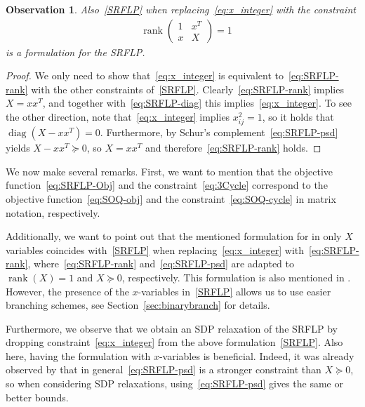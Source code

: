 \documentclass{article}
\newcommand{\SRFLP}{SRFLP\xspace}
\DeclareMathOperator{\rank}{rank}
\DeclareMathOperator{\diag}{diag}
\newtheorem{observation}[theorem]{Observation}
\begin{document}
\begin{observation}\label{obs:rank-x_integer}
    Also~\eqref{SRFLP} when replacing~\eqref{eq:x_integer} with the constraint
    \begin{align}
    & \rank\begin{pmatrix}
    1 & x^T \\
    x & X
\end{pmatrix} = 1 \label{eq:SRFLP-rank}
    \end{align}
    is a formulation for the \SRFLP.
\end{observation}
\begin{proof} 
    We only need to show that~\eqref{eq:x_integer} is equivalent to~\eqref{eq:SRFLP-rank} with the other constraints of~\eqref{SRFLP}.
    Clearly~\eqref{eq:SRFLP-rank} implies $X = xx^T$, and together with~\eqref{eq:SRFLP-diag} this implies~\eqref{eq:x_integer}. To see the other direction, note that~\eqref{eq:x_integer} implies $x_{ij}^2 = 1$, so it holds that $\diag(X - xx^T)=0$. Furthermore, by Schur's complement~\eqref{eq:SRFLP-psd} yields $X-xx^T \succeq 0$, so $X = xx^T$ and therefore~\eqref{eq:SRFLP-rank} holds.
\end{proof}

We now make several remarks.
First, we want to mention that the objective function~\eqref{eq:SRFLP-Obj} and the constraint~\eqref{eq:3Cycle} correspond to the objective function~\eqref{eq:SOQ-obj} and the constraint~\eqref{eq:SOQ-cycle} in matrix notation, respectively.

Additionally, we want to point out that the mentioned formulation for \citet{anjos_semidefinite_2005} in only $X$ variables coincides with~\eqref{SRFLP} when replacing~\eqref{eq:x_integer} with~\eqref{eq:SRFLP-rank}, where~\eqref{eq:SRFLP-rank} and~\eqref{eq:SRFLP-psd} are adapted to $\rank(X) = 1$ and $X\succeq0$, respectively. This formulation is also mentioned in \citet{anjos_provably_2009}. 
However, the presence of the $x$-variables in~\eqref{SRFLP} allows us to use easier branching schemes, see Section~\ref{sec:binarybranch} for details. 

Furthermore, we observe that we obtain an SDP relaxation of the \SRFLP by dropping constraint~\eqref{eq:x_integer} from the above formulation~\eqref{SRFLP}. 
Also here, having the formulation with $x$-variables is beneficial. 
Indeed, it was already observed by \citet{hungerlander_computational_2013} 
that in general~\eqref{eq:SRFLP-psd} is a stronger constraint than $X\succeq0$, so when considering SDP relaxations, using~\eqref{eq:SRFLP-psd} gives the same or better bounds.
\end{document}
